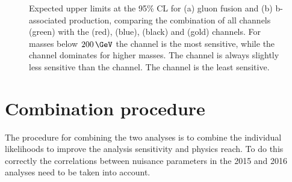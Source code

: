 \begin{figure}[h!]
\begin{center}
\end{center}
\caption[Expected upper limits at the 95\% CL for the gluon fusion and b-associated
production, comparing the combination of all channels with the per-channel limits.]{Expected upper limits at the 95\% \ac{CL} for (a) gluon fusion and (b) b-associated production,
comparing the combination of all channels (green) with the \mutau (red), \etau (blue), \tautau (black)
and \emu (gold) channels. For masses below $200\,\GeV$ the \mutau channel is the most sensitive,
while the \tautau channel dominates for higher masses. The \etau channel is always
slightly less sensitive than the \mutau channel. The \emu channel is the least sensitive.}
\label{fig:mssm_results_limits_breakdown_hig16006}
\end{figure}

\section{Combination procedure}
\label{sec:mssm_combination_procedure}
The procedure for combining the two analyses is to combine the 
individual likelihoods to improve the analysis sensitivity and
physics reach. To do this correctly the correlations between
nuisance parameters in the 2015 and 2016 analyses need to be taken into account.

